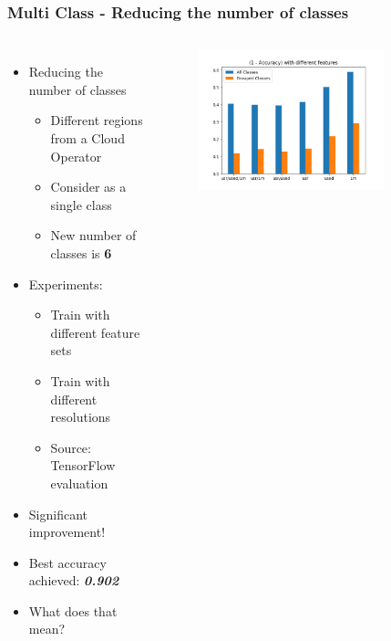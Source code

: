 \documentclass[aspectratio=169,11pt,hyperref={colorlinks=true}]{beamer}
\begin{document}
\begin{frame}
    \frametitle{Multi Class - Reducing the number of classes}
    \begin{columns}
        \begin{itemize}
            \item{Reducing the number of classes}
            \begin{itemize}
                \item{Different regions from a Cloud Operator}
                \item{Consider as a single class}
                \item{New number of classes is \textbf{6}}
            \end{itemize}
            \item{Experiments:}
              \begin{itemize}
                \item{Train with different feature sets}
                \item{Train with different resolutions}
                \item{Source: TensorFlow evaluation}
            \end{itemize}
            \item{Significant improvement!}
            \item{Best accuracy achieved: \emph{\textbf{0.902}}}
            \item{What does that mean?}
        \end{itemize}
        \begin{center}
        \begin{figure}
          \includegraphics[width=0.8\textwidth,height=0.4\textheight]{graphs/accuracy_by_feature-compare-classes.png}

\end{figure}
\end{center}
\end{columns}
\end{frame}
\end{document}
